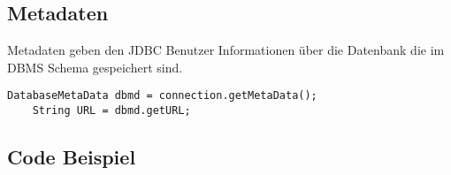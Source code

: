 \subsection{Metadaten}
Metadaten geben den JDBC Benutzer Informationen über die Datenbank die im DBMS Schema gespeichert sind.
\begin{lstlisting}[style=Java]
    DatabaseMetaData dbmd = connection.getMetaData();
    String URL = dbmd.getURL;
\end{lstlisting}

\subsection{Code Beispiel}



